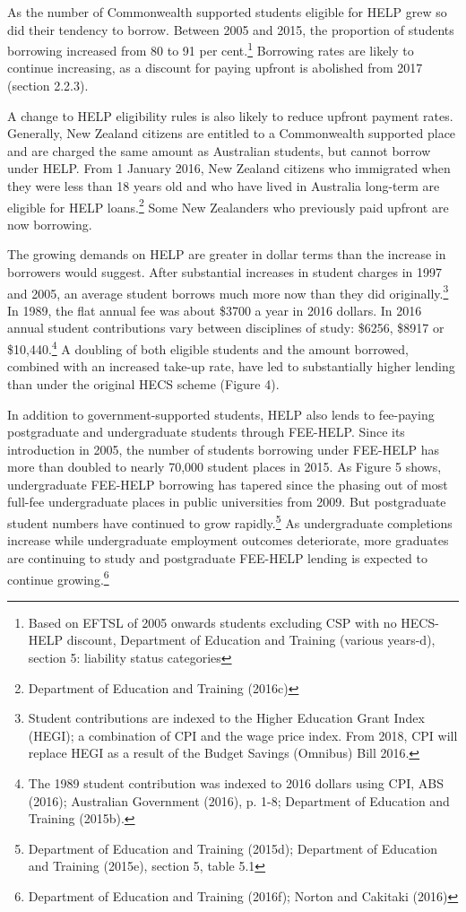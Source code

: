 \documentclass[embargoed]{grattan}
\begin{document}
As the number of Commonwealth supported students eligible for HELP grew so did their tendency to borrow. Between 2005 and 2015, the proportion of students borrowing increased from 80 to 91 per cent.\footnote{Based on EFTSL of 2005 onwards students excluding CSP with no HECS-HELP discount, Department of Education and Training (various years-d), section 5: liability status categories} Borrowing rates are likely to continue increasing, as a discount for paying upfront is abolished from 2017 (section 2.2.3).

A change to HELP eligibility rules is also likely to reduce upfront payment rates. Generally, New Zealand citizens are entitled to a Commonwealth supported place and are charged the same amount as Australian students, but cannot borrow under HELP. From 1 January 2016, New Zealand citizens who immigrated when they were less than 18 years old and who have lived in Australia long-term are eligible for HELP loans.\footnote{Department of Education and Training (2016c)} Some New Zealanders who previously paid upfront are now borrowing.

The growing demands on HELP are greater in dollar terms than the increase in borrowers would suggest. After substantial increases in student charges in 1997 and 2005, an average student borrows much more now than they did originally.\footnote{Student contributions are indexed to the Higher Education Grant Index (HEGI); a combination of CPI and the wage price index. From 2018, CPI will replace HEGI as a result of the Budget Savings (Omnibus) Bill 2016.} In 1989, the flat annual fee was about \$3700 a year in 2016 dollars. In 2016 annual student contributions vary between disciplines of study: \$6256, \$8917 or \$10,440.\footnote{The 1989 student contribution was indexed to 2016 dollars using CPI, ABS (2016); Australian Government (2016), p. 1-8; Department of Education and Training (2015b).} A doubling of both eligible students and the amount borrowed, combined with an increased take-up rate, have led to substantially higher lending than under the original HECS scheme (Figure 4).

In addition to government-supported students, HELP also lends to fee-paying postgraduate and undergraduate students through FEE-HELP. Since its introduction in 2005, the number of students borrowing under FEE-HELP has more than doubled to nearly 70,000 student places in 2015. As Figure 5 shows, undergraduate FEE-HELP borrowing has tapered since the phasing out of most full-fee undergraduate places in public universities from 2009. But postgraduate student numbers have continued to grow rapidly.\footnote{Department of Education and Training (2015d); Department of Education and Training (2015e), section 5, table 5.1} As undergraduate completions increase while undergraduate employment outcomes deteriorate, more graduates are continuing to study and postgraduate FEE-HELP lending is expected to continue growing.\footnote{Department of Education and Training (2016f); Norton and Cakitaki (2016)}
\end{document}
